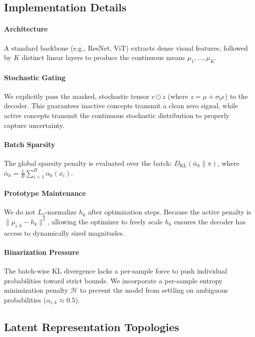 \documentclass[11pt, a4paper]{article}
\begin{document}
\subsection{Implementation Details}

\paragraph{Architecture}
A standard backbone (e.g., ResNet, ViT) extracts dense visual features, followed by $K$ distinct linear layers to produce the continuous means $\mu_1, \dots, \mu_K$.

\paragraph{Stochastic Gating}
We explicitly pass the masked, stochastic tensor $c \odot z$ (where $z = \mu + \sigma_0 \epsilon$) to the decoder. This guarantees inactive concepts transmit a clean zero signal, while active concepts transmit the continuous stochastic distribution to properly capture uncertainty.

\paragraph{Batch Sparsity}
The global sparsity penalty is evaluated over the batch: $D_{\mathrm{KL}}(\bar{\alpha}_k \parallel \pi)$, where $\bar{\alpha}_k = \frac{1}{B} \sum_{i=1}^B \alpha_k(x_i)$.

\paragraph{Prototype Maintenance}
We do not $L_2$-normalize $h_k$ after optimization steps. Because the active penalty is $\|\mu_{i,k} - h_k\|^2$, allowing the optimizer to freely scale $h_k$ ensures the decoder has access to dynamically sized magnitudes.

\paragraph{Binarization Pressure}
The batch-wise KL divergence lacks a per-sample force to push individual probabilities toward strict bounds. We incorporate a per-sample entropy minimization penalty $\mathcal{H}$ to prevent the model from settling on ambiguous probabilities ($\alpha_{i,k} \approx 0.5$).

\subsection{Latent Representation Topologies}
\end{document}

